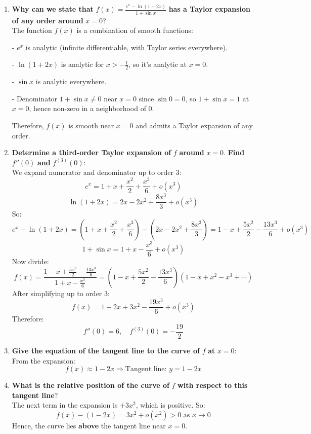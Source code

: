 \documentclass[12pt]{article}
\begin{document}
\begin{answerbox}
  \begin{enumerate}
    \item \textbf{Why can we state that } $ f(x) = \frac{e^x - \ln(1 + 2x)}{1 + \sin x} $ \textbf{ has a Taylor expansion of any order around } $ x = 0 $? \\
    The function $ f(x) $ is a combination of smooth functions:
    
        
- $ e^x $ is analytic (infinite differentiable, with Taylor series everywhere).
        
- $ \ln(1 + 2x) $ is analytic for $ x > -\frac{1}{2} $, so it's analytic at $ x = 0 $.
        
- $ \sin x $ is analytic everywhere.
        
- Denominator $ 1 + \sin x \neq 0 $ near $ x = 0 $ since $ \sin 0 = 0 $, so $ 1 + \sin x = 1 $ at $ x = 0 $, hence non-zero in a neighborhood of 0.
    
    Therefore, $ f(x) $ is smooth near $ x = 0 $ and admits a Taylor expansion of any order.

    \item \textbf{Determine a third-order Taylor expansion of } $ f $ \textbf{around } $ x = 0 $. \textbf{Find } $ f''(0) $ \textbf{and } $ f^{(3)}(0) $: \\
    We expand numerator and denominator up to order 3:
    $$
    e^x = 1 + x + \frac{x^2}{2} + \frac{x^3}{6} + o(x^3)
    $$
    $$
    \ln(1 + 2x) = 2x - 2x^2 + \frac{8x^3}{3} + o(x^3)
    $$
    So:
    $$
    e^x - \ln(1 + 2x) = (1 + x + \frac{x^2}{2} + \frac{x^3}{6}) - (2x - 2x^2 + \frac{8x^3}{3}) = 1 - x + \frac{5x^2}{2} - \frac{13x^3}{6} + o(x^3)
    $$
    $$
    1 + \sin x = 1 + x - \frac{x^3}{6} + o(x^3)
    $$
    Now divide:
    $$
    f(x) = \frac{1 - x + \frac{5x^2}{2} - \frac{13x^3}{6}}{1 + x - \frac{x^3}{6}} = (1 - x + \frac{5x^2}{2} - \frac{13x^3}{6})(1 - x + x^2 - x^3 + \cdots)
    $$
    After simplifying up to order 3:
    $$
    f(x) = 1 - 2x + 3x^2 - \frac{19x^3}{6} + o(x^3)
    $$
    Therefore:
    $$
    f''(0) = 6, \quad f^{(3)}(0) = -\frac{19}{2}
    $$

    \item \textbf{Give the equation of the tangent line to the curve of } $ f $ \textbf{at } $ x = 0 $: \\
    From the expansion:
    $$
    f(x) \approx 1 - 2x \Rightarrow \text{Tangent line: } y = 1 - 2x
    $$

    \item \textbf{What is the relative position of the curve of } $ f $ \textbf{with respect to this tangent line}? \\
    The next term in the expansion is $ +3x^2 $, which is positive. So:
    $$
    f(x) - (1 - 2x) = 3x^2 + o(x^2) > 0 \text{ as } x \to 0
    $$
    Hence, the curve lies \textbf{above} the tangent line near $ x = 0 $.
\end{enumerate}
\end{answerbox}
\end{document}

